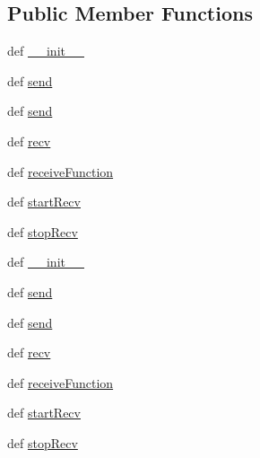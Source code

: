 \subsection*{Public Member Functions}
\begin{DoxyCompactItemize}
\item 
def \hyperlink{classnetwork_1_1commsChannel_1_1UDPChannel_ae3e90f5c66765ae3f5d97334bb9767ad}{\+\_\+\+\_\+init\+\_\+\+\_\+}
\item 
def \hyperlink{classnetwork_1_1commsChannel_1_1UDPChannel_a7aeb7a38b3072fab11df4881fb22dd67}{send}
\item 
def \hyperlink{classnetwork_1_1commsChannel_1_1UDPChannel_a7aeb7a38b3072fab11df4881fb22dd67}{send}
\item 
def \hyperlink{classnetwork_1_1commsChannel_1_1UDPChannel_aeeda07b7e78ec0750501ca40d114aadc}{recv}
\item 
def \hyperlink{classnetwork_1_1commsChannel_1_1UDPChannel_a0e4df6f6b2e9030f6b58a945ab15e71d}{receive\+Function}
\item 
def \hyperlink{classnetwork_1_1commsChannel_1_1UDPChannel_a1a31b8bce874232ee25a022fe8a358dc}{start\+Recv}
\item 
def \hyperlink{classnetwork_1_1commsChannel_1_1UDPChannel_aa3eb1e0f39dbf4a9fed075600b104772}{stop\+Recv}
\item 
def \hyperlink{classnetwork_1_1commsChannel_1_1UDPChannel_ae3e90f5c66765ae3f5d97334bb9767ad}{\+\_\+\+\_\+init\+\_\+\+\_\+}
\item 
def \hyperlink{classnetwork_1_1commsChannel_1_1UDPChannel_a7aeb7a38b3072fab11df4881fb22dd67}{send}
\item 
def \hyperlink{classnetwork_1_1commsChannel_1_1UDPChannel_a7aeb7a38b3072fab11df4881fb22dd67}{send}
\item 
def \hyperlink{classnetwork_1_1commsChannel_1_1UDPChannel_aeeda07b7e78ec0750501ca40d114aadc}{recv}
\item 
def \hyperlink{classnetwork_1_1commsChannel_1_1UDPChannel_a0e4df6f6b2e9030f6b58a945ab15e71d}{receive\+Function}
\item 
def \hyperlink{classnetwork_1_1commsChannel_1_1UDPChannel_a1a31b8bce874232ee25a022fe8a358dc}{start\+Recv}
\item 
def \hyperlink{classnetwork_1_1commsChannel_1_1UDPChannel_aa3eb1e0f39dbf4a9fed075600b104772}{stop\+Recv}
\end{DoxyCompactItemize}
